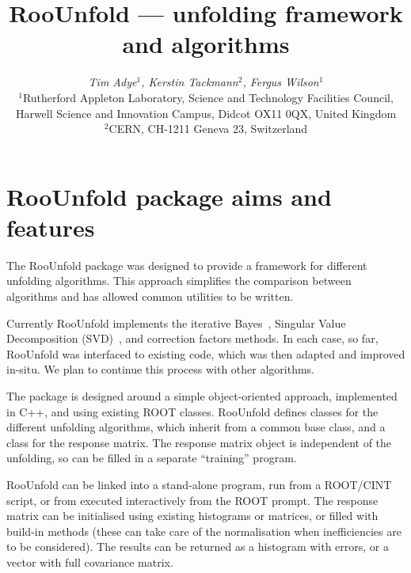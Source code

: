 \documentclass{desyproc}
\begin{document}
\title{RooUnfold --- unfolding framework and algorithms}

\author{{\slshape Tim Adye$^1$, Kerstin Tackmann$^2$, Fergus Wilson$^1$}\\[1ex]
$^1$Rutherford Appleton Laboratory, Science and Technology Facilities Council, Harwell Science and Innovation Campus, Didcot OX11 0QX, United Kingdom\\
$^2$CERN, CH-1211 Geneva 23, Switzerland}

\doi            %

\maketitle

\begin{abstract}
\end{abstract}

\section{RooUnfold package aims and features}

The RooUnfold package was designed to provide a framework for different unfolding algorithms.
This approach simplifies the comparison between algorithms and has allowed
common utilities to be written.

Currently RooUnfold implements the iterative Bayes~\cite{D'Agostini:1994zf},
Singular Value Decomposition (SVD)~\cite{Hocker:1995kb}, and correction factors methods.
In each case, so far, RooUnfold was interfaced to existing code, which
was then adapted and improved in-situ. We plan to continue this process with
other algorithms.

The package is designed around a simple object-oriented approach, implemented in
C++, and using existing ROOT classes. RooUnfold defines classes for the different
unfolding algorithms, which inherit from a common base class, and a class for
the response matrix. The response matrix object is independent of the unfolding,
so can be filled in a separate ``training'' program.

RooUnfold can be linked into a stand-alone program, run from a ROOT/CINT script, or
from executed interactively from the ROOT prompt.
The response matrix can be initialised using existing histograms or matrices, or
filled with build-in methods (these can take care of the normalisation when inefficiencies are to be considered).
The results can be returned as a histogram with errors, or a vector with full covariance matrix.
\end{document}

